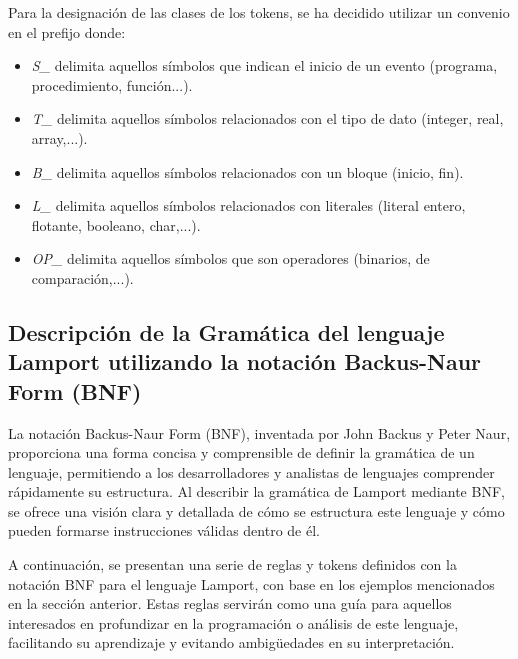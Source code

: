 \newpage

Para la designación de las clases de los tokens, se ha decidido utilizar un convenio en el prefijo donde:

\begin{itemize}
    \item \textit{S\_} delimita aquellos símbolos que indican el inicio de un evento (programa, procedimiento, 
    función...).
    \item \textit{T\_} delimita aquellos símbolos relacionados con el tipo de dato (integer, real, array,...).
    \item \textit{B\_} delimita aquellos símbolos relacionados con un bloque (inicio, fin).
    \item \textit{L\_} delimita aquellos símbolos relacionados con literales (literal entero, flotante, booleano, char,...).
    \item \textit{OP\_} delimita aquellos símbolos que son operadores (binarios, de comparación,...).
\end{itemize}

\subsection{Descripción de la Gramática del lenguaje Lamport utilizando la notación Backus-Naur Form (BNF)}\label{subsec:sintaxisLamport}

La notación Backus-Naur Form (BNF), inventada por John Backus y Peter Naur, proporciona una forma concisa y comprensible de definir la gramática de un lenguaje, permitiendo a los desarrolladores y analistas de lenguajes comprender rápidamente su estructura. Al describir la gramática de Lamport mediante BNF, se ofrece una visión clara y detallada de cómo se estructura este lenguaje y cómo pueden formarse instrucciones válidas dentro de él.

\vspace{0.5cm}

A continuación, se presentan una serie de reglas y tokens definidos con la notación BNF para el lenguaje Lamport, con base en los ejemplos mencionados en la sección anterior. Estas reglas servirán como una guía para aquellos interesados en profundizar en la programación o análisis de este lenguaje, facilitando su aprendizaje y evitando ambigüedades en su interpretación.

\newpage

